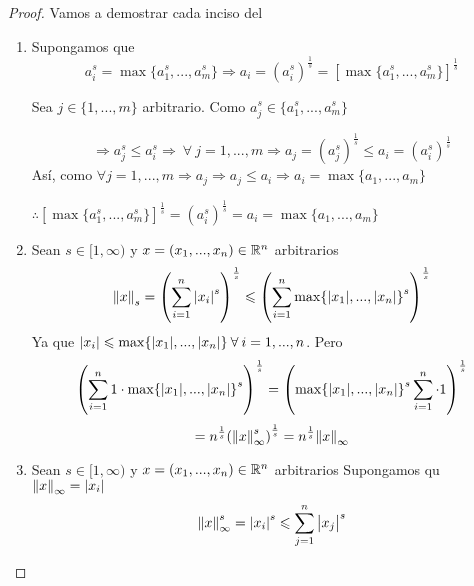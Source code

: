 \begin{proof}
    Vamos a demostrar cada inciso del 
    \begin{enumerate}
        \item Supongamos que
        \begin{equation*}
            {a}_{i}^{s} = \max \{ {a}_{1}^{s}, ... , {a}_{m}^{s} \} \Rightarrow a_i = {({a}_{i}^{s})}^{\frac{1}{s}} = {[\max \{ {a}_{1}^{s}, ... , {a}_{m}^{s} \}]}^{\frac{1}{s}}
        \end{equation*}

        Sea $j \in \{ 1,...,m \}$ arbitrario. Como ${a}_{j}^{s} \in \{ {a}_{1}^{s}, ... , {a}_{m}^{s} \}$

        \begin{equation*}
            \Rightarrow {a}_{j}^{s} \leqslant {a}_{i}^{s} \Rightarrow \: \forall \: j = 1,...,m \Rightarrow a_j = {({a}_{j}^{s})}^{\frac{1}{s}} \leqslant a_i = {({a}_{i}^{s})}^{\frac{1}{s}}
        \end{equation*}
        Así, como $\forall j = 1,...,m \Rightarrow a_j \Rightarrow a_j \leqslant a_i \Rightarrow a_i = \max \{ {a}_{1}, ... , {a}_{m}\} $

        $\therefore {[\max \{ {a}_{1}^{s}, ... , {a}_{m}^{s} \}]}^{\frac{1}{s}} =  {({a}_{i}^{s})}^{\frac{1}{s}} = a_i = \max \{ {a}_{1}, ... , {a}_{m}\} $
        \item Sean $s \in [1,\infty)$ y $x=(x_1,...,x_n) \in \mathbb{R}^n$ arbitrarios
        \begin{equation*}
            {\norm{x}}_{s} =  {\left( \sum_{i=1}^{n} {\abs{{x}_{i}}}^{s}\right)}^{\frac{1}{s}} \leqslant  {\left( \sum_{i=1}^{n} {\max \{ \abs{x_1},..., \abs{x_n}\}}^{s}\right)}^{\frac{1}{s}}
        \end{equation*}
        Ya que $\abs{x_i} \leqslant \max \{ \abs{x_1},..., \abs{x_n}\} \: \forall \: i = 1,...,n$. Pero 
        \begin{equation*}
            {\left( \sum_{i=1}^{n} 1 \cdot {\max \{ \abs{x_1},..., \abs{x_n}\}}^{s}\right)}^{\frac{1}{s}} =  {\left( {\max \{ \abs{x_1},..., \abs{x_n}\}}^{s} \sum_{i=1}^{n} \cdot 1\right)}^{\frac{1}{s}}
        \end{equation*}
        \begin{equation*}
             = {n}^{\frac{1}{s}} {({\norm{x}}^{s}_{\infty} )}^{\frac{1}{s}} = {n}^{\frac{1}{s}} {\norm{x}}_{\infty}
        \end{equation*}
        \item Sean $s \in [1,\infty)$ y $x=(x_1,...,x_n) \in \mathbb{R}^n$ arbitrarios
        Supongamos qu ${\norm{x}}_{\infty} = \abs{{x}_{i}}$
        \begin{equation*}
            {\norm{x}}^{s}_{\infty} = {\abs{{x}_{i}}}^{s} \leqslant \sum_{j=1}^{n} {\abs{{x}_{j}}}^{s} 
        \end{equation*}


\end{enumerate}
\end{proof}
